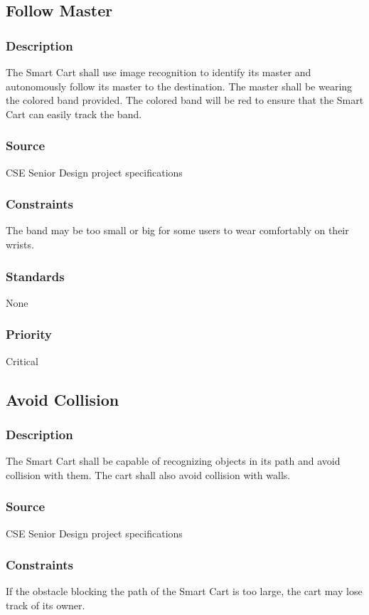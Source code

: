 \subsection{Follow Master}
\subsubsection{Description}
The Smart Cart shall use image recognition to identify its master and autonomously follow its master to the destination. The master shall be wearing the colored band provided. The colored band will be red to ensure that the Smart Cart can easily track the band.
\subsubsection{Source}
CSE Senior Design project specifications
\subsubsection{Constraints}
The band may be too small or big for some users to wear comfortably on their wrists. 
\subsubsection{Standards}
None
\subsubsection{Priority}
Critical


\subsection{Avoid Collision}
\subsubsection{Description}
The Smart Cart shall be capable of recognizing objects in its path and avoid collision with them. The cart shall also avoid collision with walls.
\subsubsection{Source}
CSE Senior Design project specifications
\subsubsection{Constraints}
If the obstacle blocking the path of the Smart Cart is too large, the cart may lose track of its owner. 
